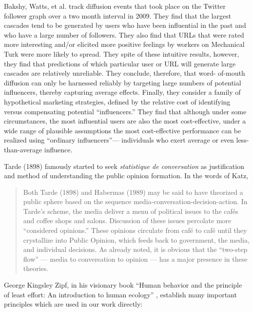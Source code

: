 \documentclass[10pt,oneside]{memoir}
\begin{document}
Bakshy, Watts, et al. \cite{bakshy2011everyone} track diffusion events that took place on the Twitter follower graph over a two month interval in 2009. They find that the largest cascades tend to be generated by users who have been influential in the past and who have a large number of followers. They also find that URLs that were rated more interesting and/or elicited more positive feelings by workers on Mechanical Turk were more likely to spread. They spite of these intuitive results, however, they find that predictions of which particular user or URL will generate large cascades are relatively unreliable. They conclude, therefore, that word- of-mouth diffusion can only be harnessed reliably by targeting large numbers of potential influencers, thereby capturing average effects. Finally, they consider a family of hypothetical marketing strategies, defined by the relative cost of identifying versus compensating potential ``influencers.'' They find that although under some circumstances, the most influential users are also the most cost-effective, under a wide range of plausible assumptions the most cost-effective performance can be realized using ``ordinary influencers''--- individuals who exert average or even less-than-average influence.


Tarde (1898) famously started to seek {\itshape statistique de conversation}  as justification and method of understanding the public opinion formation.  In the words of Katz,


\begin{quote}
Both Tarde (1898) \cite{tarde1969communication} and Habermas (1989) \cite{habermas1989structural} may be said to have theorized a public sphere based on the sequence media-conversation-decision-action.  In Tarde's scheme, the media deliver a menu of political issues to the cafés and coffee shops and salons.  Discussion of these issues percolate more ``considered opinions.''  These opinions circulate from café to café until they crystallize into Public Opinion, which feeds back to government, the media, and individual decisions.  As already noted, it is obvious that the ``two-step flow'' --- media to conversation to opinion --- has a major presence in these theories. 
\end{quote}


George Kingsley Zipf, in his visionary book ``Human behavior and the principle of least effort: An introduction to human ecology'' \cite{zipf1949humanbehavior}, establish many important principles which are used in our work directly:
\end{document}
